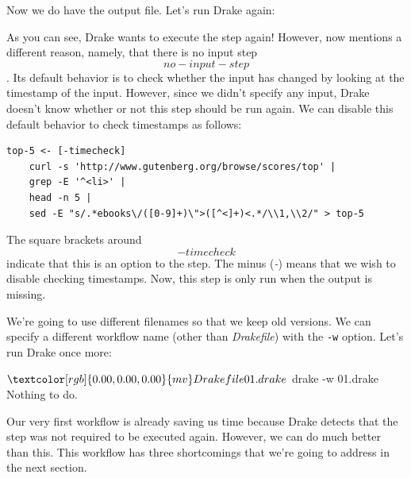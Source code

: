 \documentclass[
]{book}
\newenvironment{Shaded}{\begin{snugshade}}{\end{snugshade}}
\newcommand{\ExtensionTok}[1]{#1}
\newcommand{\FunctionTok}[1]{\textcolor[rgb]{0.00,0.00,0.00}{#1}}
\newcommand{\NormalTok}[1]{#1}
\newcommand{\OperatorTok}[1]{\textcolor[rgb]{0.81,0.36,0.00}{\textbf{#1}}}
\theoremstyle{definition}
\theoremstyle{definition}
\theoremstyle{definition}
\theoremstyle{remark}
\begin{document}
Now we do have the output file. Let's run Drake again:

\begin{Shaded}
\end{Shaded}

As you can see, Drake wants to execute the step again! However, now mentions a different reason, namely, that there is no input step \emph{\[no-input-step\]}. Its default behavior is to check whether the input has changed by looking at the timestamp of the input. However, since we didn't specify any input, Drake doesn't know whether or not this step should be run again. We can disable this default behavior to check timestamps as follows:

\begin{verbatim}
top-5 <- [-timecheck]
    curl -s 'http://www.gutenberg.org/browse/scores/top' |
    grep -E '^<li>' |
    head -n 5 |
    sed -E "s/.*ebooks\/([0-9]+)\">([^<]+)<.*/\\1,\\2/" > top-5
\end{verbatim}

The square brackets around \emph{\[-timecheck\]} indicate that this is an option to the step. The minus (\emph{-}) means that we wish to disable checking timestamps. Now, this step is only run when the output is missing.

We're going to use different filenames so that we keep old versions. We can specify a different workflow name (other than \emph{Drakefile}) with the \texttt{-w} option. Let's run Drake once more:

\begin{Shaded}
\begin{Highlighting}[]
\NormalTok{$ }\FunctionTok{mv}\NormalTok{ Drakefile 01.drake}
\NormalTok{$ }\ExtensionTok{drake}\NormalTok{ -w 01.drake}
\ExtensionTok{Nothing}\NormalTok{ to do.}
\end{Highlighting}
\end{Shaded}

Our very first workflow is already saving us time because Drake detects that the step was not required to be executed again. However, we can do much better than this. This workflow has three shortcomings that we're going to address in the next section.
\end{document}
